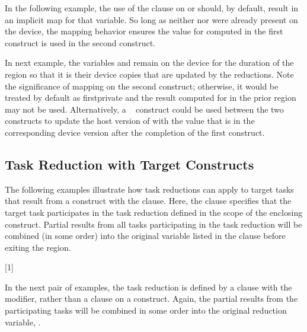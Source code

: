 In the following example, the use of the  clause on 
or  should, by default, result in an implicit  map for
that variable. So long as neither  nor  were already
present on the device, the mapping behavior ensures the value for
 computed in the first  construct is used in the
second  construct.



In next example,  the variables  and  remain on the
device for the duration of the ~ region so that it is
their device copies that are updated by the reductions. Note the significance
of mapping  on the second  construct; otherwise, it
would be treated by default as firstprivate and the result computed for
 in the prior  region may not be used. Alternatively, a
~ construct could be used between the two
 constructs to update the host version of  with the
value that is in the corresponding device version after the completion of the
first construct.




\subsection{Task Reduction with Target Constructs}
\label{subsec:target_task_reduction}

The following examples illustrate how task reductions can apply to target tasks
that result from a  construct with the 
clause. Here, the  clause specifies that the target task
participates in the task reduction defined in the scope of the enclosing
 construct. Partial results from all tasks participating in the
task reduction will be combined (in some order) into the original variable
listed in the  clause before exiting the 
region. 


[1]

In the next pair of examples, the task reduction is defined by a
 clause with the  modifier, rather than a
 clause on a  construct. Again, the
partial results from the participating tasks will be combined in some order
into the original reduction variable, .

